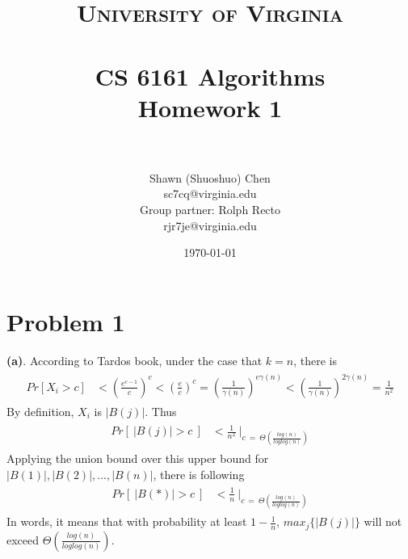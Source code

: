 \documentclass[titlepage, paper=a4, fontsize=11pt]{scrartcl} %
\title{	
\normalfont \normalsize 
\textsc{University of Virginia} \\ [25pt] %
\horrule{0.5pt} \\[0.4cm] %
\huge CS 6161 Algorithms \\
\huge Homework 1 \\ %
\horrule{2pt} \\[0.5cm] %
}
\author{Shawn (Shuoshuo) Chen\\sc7cq@virginia.edu\\Group partner: Rolph Recto\\ rjr7je@virginia.edu} %
\date{\normalsize\today} %
\numberwithin{equation}{section} %
\numberwithin{figure}{section} %
\numberwithin{table}{section} %
\begin{document}
\maketitle %


\section*{Problem 1}
\textbf{(a)}. According to Tardos book, under the case that $k = n$, there is \\
\begin{align*} 
\begin{split}
Pr[X_i > c] &< \left( \frac{e^{c-1}}{c} \right)^c < \left( \frac{e}{c} \right)^c = \left( \frac{1}{\gamma(n)} \right)^{e\gamma(n)} < \left( \frac{1}{\gamma(n)} \right)^{2\gamma(n)} = \frac{1}{n^2}
\end{split}					
\end{align*}
By definition, $X_i$ is $|B(j)|$. Thus \\
\begin{align*} 
\begin{split}
Pr[ \ |B(j)| > c \ ] &< \frac{1}{n^2} \ \bigg|_{c \ = \ \Theta(\frac{log(n)}{loglog(n)})}
\end{split}					
\end{align*}
Applying the union bound over this upper bound for $|B(1)|, |B(2)|, ..., |B(n)|$, there is following \\
\begin{align*} 
\begin{split}
Pr[ \ |B(*)| > c \ ] &< \frac{1}{n} \ \bigg|_{c \ = \ \Theta(\frac{log(n)}{loglog(n)})}
\end{split}					
\end{align*}
In words, it means that with probability at least $1 - \frac{1}{n}$, $max_j\{|B(j)|\}$ will not exceed
$\Theta(\frac{log(n)}{loglog(n)})$.
\\
\end{document}
